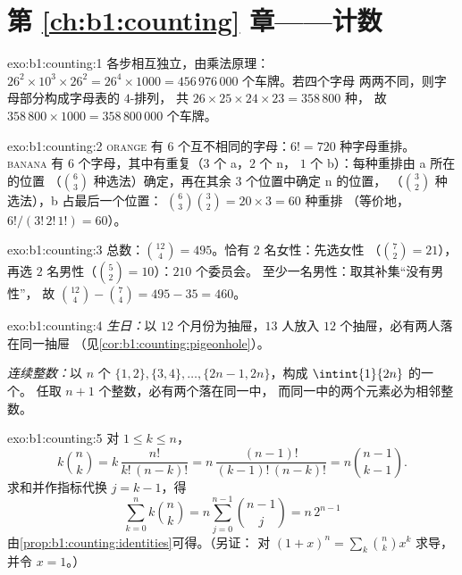 \section*{第 \ref{ch:b1:counting} 章——计数}

\begin{solution}{exo:b1:counting:1}
各步相互独立，由乘法原理：$26^2 \times 10^3 \times 26^2
= 26^4 \times 1000 = 456\,976\,000$ 个车牌。若四个字母
两两不同，则字母部分构成字母表的 $4$-排列，
共 $26 \times 25 \times 24 \times 23 = 358\,800$ 种，
故 $358\,800 \times 1000 = 358\,800\,000$ 个车牌。
\end{solution}

\begin{solution}{exo:b1:counting:2}
\textsc{orange} 有 $6$ 个互不相同的字母：$6! = 720$ 种字母重排。
\textsc{banana} 有 $6$ 个字母，其中有重复（$3$ 个 a，$2$ 个 n，
$1$ 个 b）：每种重排由 a 所在的位置
（$\binom 63$ 种选法）确定，再在其余 $3$ 个位置中确定 n 的位置，
（$\binom 32$ 种选法），b 占最后一个位置：
$\binom{6}{3}\binom{3}{2} = 20 \times 3 = 60$ 种重排
（等价地，$6!/(3!\,2!\,1!) = 60$）。
\end{solution}

\begin{solution}{exo:b1:counting:3}
总数：$\binom{12}{4} = 495$。恰有 $2$ 名女性：先选女性
（$\binom 72 = 21$），再选 $2$ 名男性（$\binom 52 = 10$）：$210$ 个委员会。
至少一名男性：取其补集“没有男性”，
故 $\binom{12}{4} - \binom{7}{4} = 495 - 35 = 460$。
\end{solution}

\begin{solution}{exo:b1:counting:4}
\emph{生日：}以 $12$ 个月份为抽屉，$13$ 人放入 $12$
个抽屉，必有两人落在同一抽屉
（见\cref{cor:b1:counting:pigeonhole}）。

\emph{连续整数：}以 $n$ 个 $\{1,2\},
\{3,4\}, \dots, \{2n-1, 2n\}$，构成 $\intint{1}{2n}$ 的一个。
任取 $n + 1$ 个整数，必有两个落在同一中，
而同一中的两个元素必为相邻整数。
\end{solution}

\begin{solution}{exo:b1:counting:5}
对 $1 \leq k \leq n$，
\[
k \binom nk = k\,\frac{n!}{k!\,(n-k)!}
= n\,\frac{(n-1)!}{(k-1)!\,(n-k)!} = n \binom{n-1}{k-1}.
\]
求和并作指标代换 $j = k - 1$，得
\[
\sum_{k=0}^{n} k \binom nk = n \sum_{j=0}^{n-1} \binom{n-1}{j}
= n\, 2^{n-1}
\]
由\cref{prop:b1:counting:identities}可得。（另证：
对 $(1+x)^n = \sum_k \binom nk x^k$ 求导，并令 $x = 1$。）
\end{solution}

